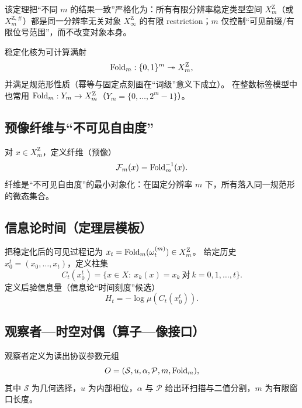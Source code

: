 该定理把“不同 $m$ 的结果一致”严格化为：所有有限分辨率稳定类型空间 $X_m^{\mathrm Z}$（或 $X_m^{\mathrm Z,\#}$）都是同一分辨率无关对象 $X_\infty^{\mathrm Z}$ 的有限 restriction；$m$ 仅控制“可见前缀/有限位号范围”，而不改变对象本身。

\begin{definition}[稳定化核]\label{def:fold}
稳定化核为可计算满射
\[
\mathrm{Fold}_m:\{0,1\}^m\twoheadrightarrow X_m^{\mathrm Z},
\]
并满足规范形性质（幂等与固定点刻画在“词级”意义下成立）。
在整数标签模型中也常用 $\mathrm{Fold}_m:Y_m\to X_m^{\mathrm Z}$（$Y_m=\{0,\dots,2^m-1\}$）。
\end{definition}

\subsection{预像纤维与“不可见自由度”}

\begin{definition}[纤维]\label{def:fiber}
对 $x\in X_m^{\mathrm Z}$，定义纤维（预像）
\[
\mathcal{F}_m(x)=\mathrm{Fold}_m^{-1}(x).
\]
纤维是“不可见自由度”的最小对象化：在固定分辨率 $m$ 下，所有落入同一规范形的微态集合。
\end{definition}

\subsection{信息论时间（定理层模板）}

\begin{definition}[柱集与后验测度]\label{def:cyl}
把稳定化后的可见过程记为 $x_t=\mathrm{Fold}_m(\omega_t^{(m)})\in X_m^{\mathrm Z}$。
给定历史 $x_0^t=(x_0,\dots,x_t)$，定义柱集
\[
C_t(x_0^t)=\{x\in X:\ x_k(x)=x_k\ \text{对}\ k=0,1,\dots,t\}.
\]
定义后验信息量（信息论“时间刻度”候选）
\[
H_t=-\log\mu(C_t(x_0^t)).
\]
\end{definition}

\subsection{观察者—时空对偶（算子—像接口）}

\begin{definition}[观察者作为读出协议参数]\label{def:observer-protocol-spec}
观察者定义为读出协议参数元组
$$
O=(\mathcal{S},u,\alpha,\mathcal{P},m,\mathrm{Fold}_m),
$$
其中 $\mathcal{S}$ 为几何选择，$u$ 为内部相位，$\alpha$ 与 $\mathcal{P}$ 给出环扫描与二值分割，$m$ 为有限窗口长度。
\end{definition}

